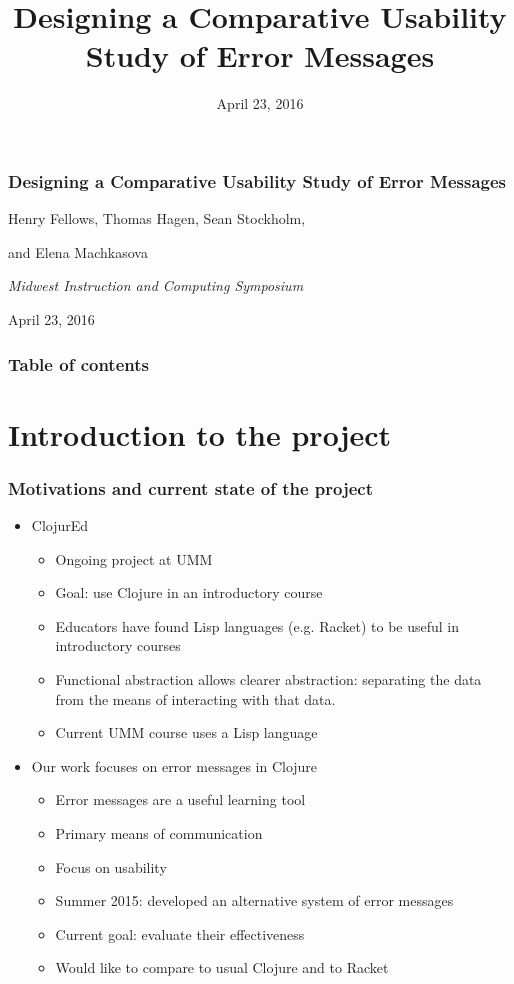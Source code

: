 \documentclass{beamer}
\begin{document}
\title{Designing a Comparative Usability Study of Error Messages}
\date{April 23, 2016}

\begin{frame}
\frametitle{Designing a Comparative Usability Study of Error Messages}
{\centering
\noindent
Henry Fellows, Thomas Hagen, Sean Stockholm, \par
and Elena Machkasova \par

{\it 
Midwest Instruction and Computing Symposium\par
April 23, 2016\par}
}
\end{frame}

\begin{frame}
\frametitle{Table of contents}
\tableofcontents  
\end{frame}

\section{Introduction to the project}

\begin{frame}
\frametitle{Motivations and current state of the project}
	\begin{itemize}
		\item ClojurEd
			\begin{itemize}
				\item Ongoing project at UMM
				\item Goal: use Clojure in an introductory course
				\item Educators have found Lisp languages (e.g. Racket) to be useful in introductory courses
				\item Functional abstraction allows clearer abstraction: separating the data from the means of interacting with that data. 
				\item Current UMM course uses a Lisp language 
			\end{itemize}
		\item Our work focuses on error messages in Clojure
			\begin{itemize}
				\item Error messages are a useful learning tool
				\item Primary means of communication
				\item Focus on usability
				\item Summer 2015: developed an alternative system of error messages
				\item Current goal: evaluate their effectiveness
				\item Would like to compare to usual Clojure and to Racket
			\end{itemize}
	\end{itemize}
\end{frame}
\end{document}
